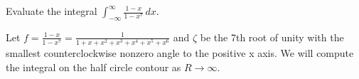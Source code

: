 \documentclass{homework}
\begin{document}
                                                                                         \begin{problem}
                                                                                           Evaluate the integral $\displaystyle\int_{-\infty}^{\infty} \frac{1-x}{1-x^7} \, dx$.
                                                                                           \end{problem}
                                                                                           \begin{solution}
                                                                                           Let $f = \frac{1-x}{1-x^7} = \frac{1}{1+x+x^2+x^3+x^4+x^5+x^6}$ and $\zeta$ be the 7th root of unity with the smallest counterclockwise nonzero angle to the positive x axis.
                                                                                           We will compute the integral on the half circle contour as $R\to\infty$.


\end{solution}
\end{document}
